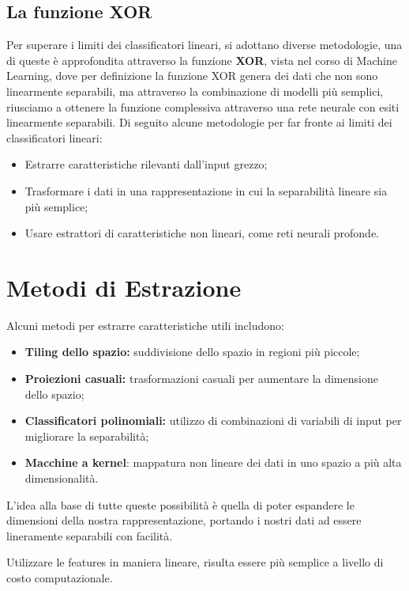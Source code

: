 \subsection{La funzione XOR}
Per superare i limiti dei classificatori lineari, si adottano diverse metodologie, una di queste è approfondita attraverso la funzione \textbf{XOR}, vista nel corso di Machine Learning, dove per definizione la funzione XOR genera dei dati che non sono linearmente separabili, ma attraverso la combinazione di modelli più semplici, riusciamo a ottenere la funzione complessiva attraverso una rete neurale con esiti linearmente separabili. Di seguito alcune metodologie per far fronte ai limiti dei classificatori lineari:
\begin{itemize}
    \item Estrarre caratteristiche rilevanti dall'input grezzo;
    \item Trasformare i dati in una rappresentazione in cui la separabilità lineare sia più semplice;
    \item Usare estrattori di caratteristiche non lineari, come reti neurali profonde.
\end{itemize}

\section{Metodi di Estrazione}
Alcuni metodi per estrarre caratteristiche utili includono:
\begin{itemize}
    \item \textbf{Tiling dello spazio:} suddivisione dello spazio in regioni più piccole;
    \item \textbf{Proiezioni casuali:} trasformazioni casuali per aumentare la dimensione dello spazio;
    \item \textbf{Classificatori polinomiali:} utilizzo di combinazioni di variabili di input per migliorare la separabilità;
    \item \textbf{Macchine a kernel}: mappatura non lineare dei dati in uno spazio a più alta dimensionalità.
\end{itemize}

L'idea alla base di tutte queste possibilità è quella di poter espandere le dimensioni della nostra rappresentazione, portando i nostri dati ad essere lineramente separabili con facilità.

\begin{Osservazione}
    Utilizzare le features in maniera lineare, risulta essere più semplice a livello di costo computazionale.
\end{Osservazione}

